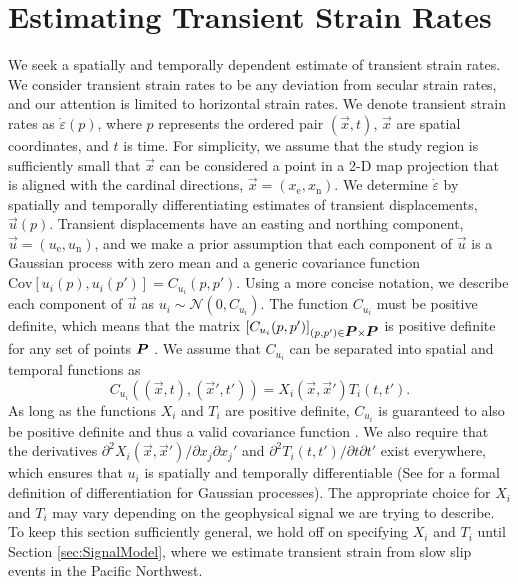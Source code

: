 \documentclass[extra,mreferee]{gji}
\begin{document}
\section{Estimating Transient Strain Rates}\label{sec:Method}
We seek a spatially and temporally dependent estimate of transient strain rates. We consider transient strain rates to be any deviation from secular strain rates, and our attention is limited to horizontal strain rates. We denote transient strain rates as $\dot\varepsilon(p)$, where $p$ represents the ordered pair $(\vec{x},t)$, $\vec{x}$ are spatial coordinates, and $t$ is time. For simplicity, we assume that the study region is sufficiently small that $\vec{x}$ can be considered a point in a 2-D map projection that is aligned with the cardinal directions, $\vec{x} = (x_\mathrm{e},x_\mathrm{n})$. We determine $\dot\varepsilon$ by spatially and temporally differentiating estimates of transient displacements, $\vec{u}(p)$. Transient displacements have an easting and northing component, $\vec{u} = (u_\mathrm{e}, u_\mathrm{n})$, and we make a prior assumption that each component of $\vec{u}$ is a Gaussian process with zero mean and a generic covariance function $\mathrm{Cov}\left[u_i(p),u_i(p')\right] = C_{u_i}(p,p')$. Using a more concise notation, we describe each component of $\vec{u}$ as $u_i \sim \mathcal{N}\left(0,C_{u_i}\right)$. The function $C_{u_i}$ must be positive definite, which means that the matrix $[C_{u_i}(p,p')]_{(p,p') \in \mitbf{P} \times \mitbf{P}}$ is positive definite for any set of points $\mitbf{P}$ \citep[sec. 2.5]{Cressie1992}. We assume that $C_{u_i}$ can be separated into spatial and temporal functions as 
\begin{equation}\label{eq:TransientCovariance}
C_{u_i}\left((\vec{x},t),(\vec{x}',t')\right) = X_i(\vec{x},\vec{x}')T_i(t,t').
\end{equation}  
As long as the functions $X_i$ and $T_i$ are positive definite, $C_{u_i}$ is guaranteed to also be positive definite and thus a valid covariance function \citep[sec. 4.2.4]{Rasmussen2006}. We also require that the derivatives $\partial^2 X_i(\vec{x},\vec{x}')/ \partial x_j \partial x_j'$ and $\partial^2 T_i(t,t') / \partial t \partial t'$ exist everywhere, which ensures that $u_i$ is spatially and temporally differentiable (See \citet[sec. 2.2]{Adler1981} for a formal definition of differentiation for Gaussian processes). The appropriate choice for $X_i$ and $T_i$ may vary depending on the geophysical signal we are trying to describe.  To keep this section sufficiently general, we hold off on specifying $X_i$ and $T_i$ until Section \ref{sec:SignalModel}, where we estimate transient strain from slow slip events in the Pacific Northwest. 
\end{document}
